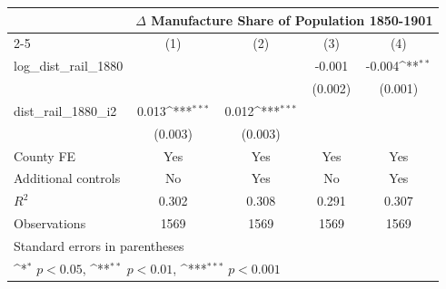 {
\def\sym#1{\ifmmode^{#1}\else\(^{#1}\)\fi}
\begin{tabular}{l*{4}{c}}
\toprule
                &\multicolumn{4}{c}{$\Delta$ Manufacture Share of Population 1850-1901}     \\\cmidrule(lr){2-5}
                &\multicolumn{1}{c}{(1)}         &\multicolumn{1}{c}{(2)}         &\multicolumn{1}{c}{(3)}         &\multicolumn{1}{c}{(4)}         \\
\midrule
log\_dist\_rail\_1880&                  &                  &   -0.001         &   -0.004\sym{**} \\
                &                  &                  &  (0.002)         &  (0.001)         \\
dist\_rail\_1880\_i2&    0.013\sym{***}&    0.012\sym{***}&                  &                  \\
                &  (0.003)         &  (0.003)         &                  &                  \\
County FE       &      Yes         &      Yes         &      Yes         &      Yes         \\
Additional controls &       No         &      Yes         &       No         &      Yes         \\
\midrule
\(R^{2}\)       &    0.302         &    0.308         &    0.291         &    0.307         \\
Observations    &     1569         &     1569         &     1569         &     1569         \\
\bottomrule
\multicolumn{5}{l}{\footnotesize Standard errors in parentheses}\\
\multicolumn{5}{l}{\footnotesize \sym{*} \(p<0.05\), \sym{**} \(p<0.01\), \sym{***} \(p<0.001\)}\\
\end{tabular}
}
